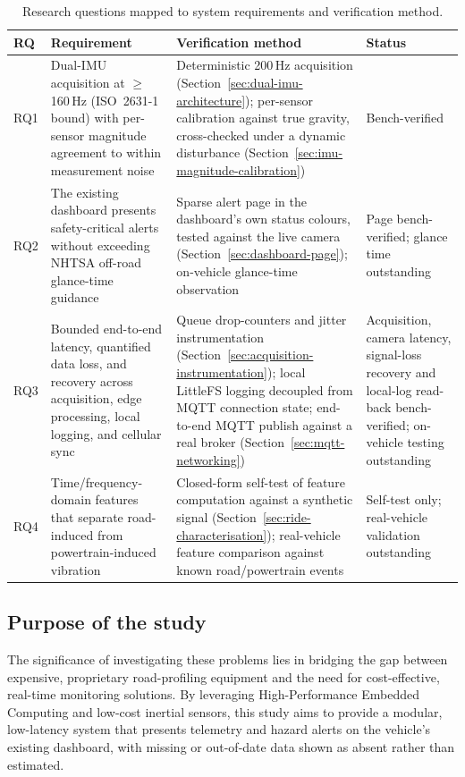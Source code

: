 \begin{table}[ht]
\centering
\caption{Research questions mapped to system requirements and verification method.}
\label{tab:requirements-mapping}
\begin{tabular}{|p{0.9cm}|p{5.4cm}|p{5.4cm}|p{2.2cm}|}
\hline
\textbf{RQ} & \textbf{Requirement} & \textbf{Verification method} & \textbf{Status} \\ \hline
RQ1 & Dual-IMU acquisition at $\geq$160\,Hz (ISO~2631-1 bound) with per-sensor magnitude agreement to within measurement noise & Deterministic 200\,Hz acquisition (Section~\ref{sec:dual-imu-architecture}); per-sensor calibration against true gravity, cross-checked under a dynamic disturbance (Section~\ref{sec:imu-magnitude-calibration}) & Bench-verified \\ \hline
RQ2 & The existing dashboard presents safety-critical alerts without exceeding NHTSA off-road glance-time guidance & Sparse alert page in the dashboard's own status colours, tested against the live camera (Section~\ref{sec:dashboard-page}); on-vehicle glance-time observation & Page bench-verified; glance time outstanding \\ \hline
RQ3 & Bounded end-to-end latency, quantified data loss, and recovery across acquisition, edge processing, local logging, and cellular sync & Queue drop-counters and jitter instrumentation (Section~\ref{sec:acquisition-instrumentation}); local LittleFS logging decoupled from MQTT connection state; end-to-end MQTT publish against a real broker (Section~\ref{sec:mqtt-networking}) & Acquisition, camera latency, signal-loss recovery and local-log read-back bench-verified; on-vehicle testing outstanding \\ \hline
RQ4 & Time/frequency-domain features that separate road-induced from powertrain-induced vibration & Closed-form self-test of feature computation against a synthetic signal (Section~\ref{sec:ride-characterisation}); real-vehicle feature comparison against known road/powertrain events & Self-test only; real-vehicle validation outstanding \\ \hline
\end{tabular}
\end{table}

\subsection{Purpose of the study}

The significance of investigating these problems lies in bridging the gap between expensive, proprietary road-profiling equipment and the need for cost-effective, real-time monitoring solutions. By leveraging High-Performance Embedded Computing and low-cost inertial sensors, this study aims to provide a modular, low-latency system that presents telemetry and hazard alerts on the vehicle's existing dashboard, with missing or out-of-date data shown as absent rather than estimated.

